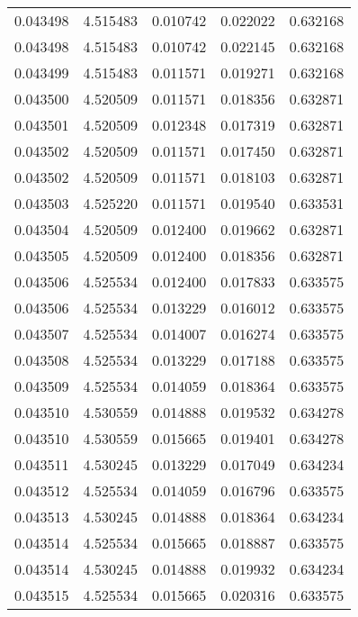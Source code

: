 \begin{tabular}{lrrrr}
0.043498    &  4.515483 &  0.010742 &  0.022022 &             0.632168 \\
0.043498    &  4.515483 &  0.010742 &  0.022145 &             0.632168 \\
0.043499    &  4.515483 &  0.011571 &  0.019271 &             0.632168 \\
0.043500    &  4.520509 &  0.011571 &  0.018356 &             0.632871 \\
0.043501    &  4.520509 &  0.012348 &  0.017319 &             0.632871 \\
0.043502    &  4.520509 &  0.011571 &  0.017450 &             0.632871 \\
0.043502    &  4.520509 &  0.011571 &  0.018103 &             0.632871 \\
0.043503    &  4.525220 &  0.011571 &  0.019540 &             0.633531 \\
0.043504    &  4.520509 &  0.012400 &  0.019662 &             0.632871 \\
0.043505    &  4.520509 &  0.012400 &  0.018356 &             0.632871 \\
0.043506    &  4.525534 &  0.012400 &  0.017833 &             0.633575 \\
0.043506    &  4.525534 &  0.013229 &  0.016012 &             0.633575 \\
0.043507    &  4.525534 &  0.014007 &  0.016274 &             0.633575 \\
0.043508    &  4.525534 &  0.013229 &  0.017188 &             0.633575 \\
0.043509    &  4.525534 &  0.014059 &  0.018364 &             0.633575 \\
0.043510    &  4.530559 &  0.014888 &  0.019532 &             0.634278 \\
0.043510    &  4.530559 &  0.015665 &  0.019401 &             0.634278 \\
0.043511    &  4.530245 &  0.013229 &  0.017049 &             0.634234 \\
0.043512    &  4.525534 &  0.014059 &  0.016796 &             0.633575 \\
0.043513    &  4.530245 &  0.014888 &  0.018364 &             0.634234 \\
0.043514    &  4.525534 &  0.015665 &  0.018887 &             0.633575 \\
0.043514    &  4.530245 &  0.014888 &  0.019932 &             0.634234 \\
0.043515    &  4.525534 &  0.015665 &  0.020316 &             0.633575 \\

\end{tabular}
